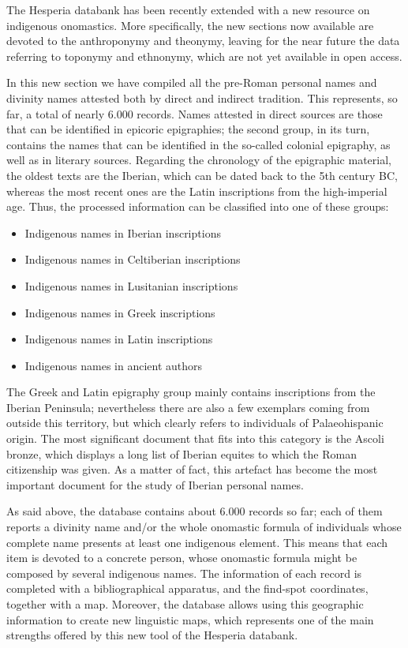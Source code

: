 \documentclass[amsthm,ebook]{saparticle}
\begin{document}
\noindent The Hesperia databank has been recently extended with a new resource on indigenous onomastics. More specifically, the
new sections now available are devoted to the anthroponymy and theonymy, leaving for the near future the data referring
to toponymy and ethnonymy, which are not yet available in open access.

In this new section we have compiled all the pre-Roman personal names and divinity names attested both by direct and
indirect tradition. This represents, so far, a total of nearly 6.000 records. Names attested in direct sources are
those that can be identified in epicoric epigraphies; the second group, in its turn, contains the names that can be
identified in the so-called colonial epigraphy, as well as in literary sources. Regarding the chronology of the
epigraphic material, the oldest texts are the Iberian, which can be dated back to the 5th century BC, whereas the most
recent ones are the Latin inscriptions from the high-imperial age. Thus, the processed information can be classified
into one of these groups:

\begin{itemize}
\item Indigenous names in Iberian inscriptions
\item Indigenous names in Celtiberian inscriptions 
\item Indigenous names in Lusitanian inscriptions
\item Indigenous names in Greek inscriptions
\item Indigenous names in Latin inscriptions
\item Indigenous names in ancient authors
\end{itemize}
The Greek and Latin epigraphy group mainly contains inscriptions from the Iberian Peninsula; nevertheless there are also
a few exemplars coming from outside this territory, but which clearly refers to individuals of Palaeohispanic origin.
The most significant document that fits into this category is the Ascoli bronze, which displays a long list of Iberian
equites to which the Roman citizenship was given. As a matter of fact, this artefact has become the most important
document for the study of Iberian personal names.

As said above, the database contains about 6.000 records so far; each of them reports a divinity name and/or the whole
onomastic formula of individuals whose complete name presents at least one indigenous element. This means that each
item is devoted to a concrete person, whose onomastic formula might be composed by several indigenous names. The
information of each record is completed with a bibliographical apparatus, and the find-spot coordinates, together with
a map. Moreover, the database allows using this geographic information to create new linguistic maps, which represents
one of the main strengths offered by this new tool of the Hesperia databank.
\end{document}
